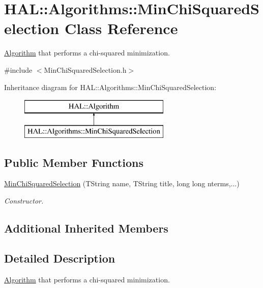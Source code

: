 \hypertarget{class_h_a_l_1_1_algorithms_1_1_min_chi_squared_selection}{\section{H\+A\+L\+:\+:Algorithms\+:\+:Min\+Chi\+Squared\+Selection Class Reference}
\label{class_h_a_l_1_1_algorithms_1_1_min_chi_squared_selection}
}


\hyperlink{class_h_a_l_1_1_algorithm}{Algorithm} that performs a chi-\/squared minimization.  




{\ttfamily \#include $<$Min\+Chi\+Squared\+Selection.\+h$>$}

Inheritance diagram for H\+A\+L\+:\+:Algorithms\+:\+:Min\+Chi\+Squared\+Selection\+:\begin{figure}[H]
\begin{center}
\leavevmode
\includegraphics[height=2.000000cm]{class_h_a_l_1_1_algorithms_1_1_min_chi_squared_selection}
\end{center}
\end{figure}
\subsection*{Public Member Functions}
\begin{DoxyCompactItemize}
\item 
\hyperlink{class_h_a_l_1_1_algorithms_1_1_min_chi_squared_selection_a35bb157bbc031560febdbd377d94f429}{Min\+Chi\+Squared\+Selection} (T\+String name, T\+String title, long long nterms,...)
\begin{DoxyCompactList}\small\item\em Constructor. \end{DoxyCompactList}\end{DoxyCompactItemize}
\subsection*{Additional Inherited Members}


\subsection{Detailed Description}
\hyperlink{class_h_a_l_1_1_algorithm}{Algorithm} that performs a chi-\/squared minimization. 

